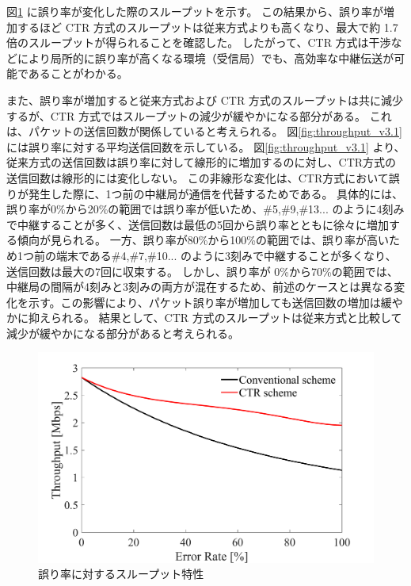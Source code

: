 \documentclass[a4paper,10.5pt]{ltjsarticle}
\begin{document}
図\ref{fig:throughput_v3} に誤り率が変化した際のスループットを示す。
この結果から、誤り率が増加するほど CTR 方式のスループットは従来方式よりも高くなり、最大で約 1.7倍のスループットが得られることを確認した。
したがって、CTR 方式は干渉などにより局所的に誤り率が高くなる環境（受信局）でも、高効率な中継伝送が可能であることがわかる。
\par
また、誤り率が増加すると従来方式および CTR 方式のスループットは共に減少するが、CTR 方式ではスループットの減少が緩やかになる部分がある。
これは、パケットの送信回数が関係していると考えられる。
図\ref{fig:throughput_v3.1} には誤り率に対する平均送信回数を示している。
図\ref{fig:throughput_v3.1} より、従来方式の送信回数は誤り率に対して線形的に増加するのに対し、CTR方式の送信回数は線形的には変化しない。
この非線形な変化は、CTR方式において誤りが発生した際に、1つ前の中継局が通信を代替するためである。
具体的には、誤り率が0\%から20\%の範囲では誤り率が低いため、\#5,\#9,\#13... のように4刻みで中継することが多く、送信回数は最低の5回から誤り率とともに徐々に増加する傾向が見られる。
一方、誤り率が80\%から100\%の範囲では、誤り率が高いため1つ前の端末である\#4,\#7,\#10... のように3刻みで中継することが多くなり、送信回数は最大の7回に収束する。
しかし、誤り率が 0\%から70\%の範囲では、中継局の間隔が4刻みと3刻みの両方が混在するため、前述のケースとは異なる変化を示す。この影響により、パケット誤り率が増加しても送信回数の増加は緩やかに抑えられる。
結果として、CTR 方式のスループットは従来方式と比較して減少が緩やかになる部分があると考えられる。
\begin{figure}[H]
  \centering
  \includegraphics[width=\linewidth]{throughput_probabilistic_retry_v3.pdf} %
  \caption{誤り率に対するスループット特性}
  \label{fig:throughput_v3} %
\end{figure}
\end{document}
